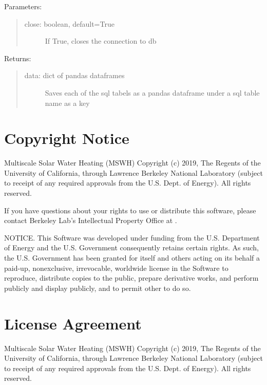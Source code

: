\documentclass[letterpaper,10pt,english,openany]{sphinxmanual}
\begin{document}
\begin{fulllineitems}
\begin{fulllineitems}
Parameters:
\begin{quote}
\begin{description}
\item[{close: boolean, default=True}] \leavevmode
If True, closes the connection to db

\end{description}
\end{quote}

Returns:
\begin{quote}
\begin{description}
\item[{data: dict of pandas dataframes}] \leavevmode
Saves each of the sql tabels as a
pandas dataframe under a sql table
name as a key

\end{description}
\end{quote}

\end{fulllineitems}


\end{fulllineitems}



\chapter{Copyright Notice}
\label{\detokenize{source/legal:copyright-notice}}\label{\detokenize{source/legal::doc}}
Multiscale Solar Water Heating (MSWH) Copyright (c) 2019, The
Regents of the University of California, through Lawrence Berkeley National
Laboratory (subject to receipt of any required approvals from the U.S.
Dept. of Energy).  All rights reserved.

If you have questions about your rights to use or distribute this software,
please contact Berkeley Lab’s Intellectual Property Office at
.

NOTICE.  This Software was developed under funding from the U.S. Department
of Energy and the U.S. Government consequently retains certain rights.  As
such, the U.S. Government has been granted for itself and others acting on
its behalf a paid-up, nonexclusive, irrevocable, worldwide license in the
Software to reproduce, distribute copies to the public, prepare derivative
works, and perform publicly and display publicly, and to permit other to do
so.


\chapter{License Agreement}
\label{\detokenize{source/legal:license-agreement}}
Multiscale Solar Water Heating (MSWH) Copyright (c) 2019, The
Regents of the University of California, through Lawrence Berkeley National
Laboratory (subject to receipt of any required approvals from the U.S.
Dept. of Energy).  All rights reserved.
\end{document}
